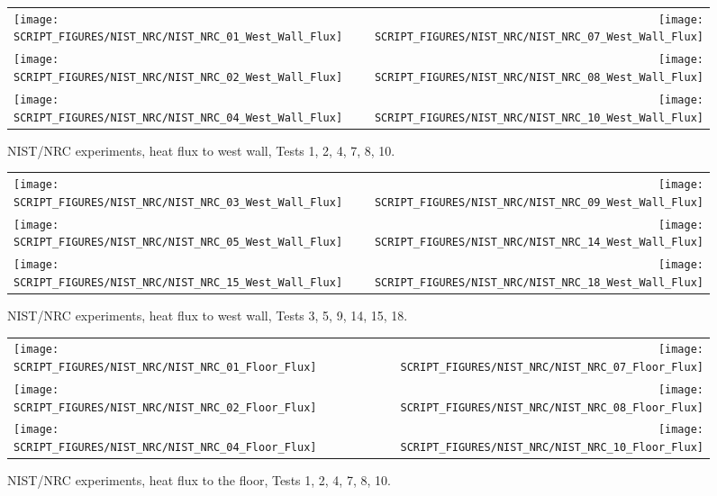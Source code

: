 \begin{figure}[p]
\begin{tabular*}{\textwidth}{l@{\extracolsep{\fill}}r}
\texttt{[image: SCRIPT\_FIGURES/NIST\_NRC/NIST\_NRC\_01\_West\_Wall\_Flux]} &
\texttt{[image: SCRIPT\_FIGURES/NIST\_NRC/NIST\_NRC\_07\_West\_Wall\_Flux]} \\
\texttt{[image: SCRIPT\_FIGURES/NIST\_NRC/NIST\_NRC\_02\_West\_Wall\_Flux]} &
\texttt{[image: SCRIPT\_FIGURES/NIST\_NRC/NIST\_NRC\_08\_West\_Wall\_Flux]} \\
\texttt{[image: SCRIPT\_FIGURES/NIST\_NRC/NIST\_NRC\_04\_West\_Wall\_Flux]} &
\texttt{[image: SCRIPT\_FIGURES/NIST\_NRC/NIST\_NRC\_10\_West\_Wall\_Flux]}
\end{tabular*}
\caption[NIST/NRC experiments, heat flux to west wall, Tests 1, 2, 4, 7, 8, 10]{NIST/NRC experiments, heat flux to west wall, Tests 1, 2, 4, 7, 8, 10.}
\label{NIST_NRC_West_Wall_Flux_Closed}
\end{figure}

\begin{figure}[p]
\begin{tabular*}{\textwidth}{l@{\extracolsep{\fill}}r}
\texttt{[image: SCRIPT\_FIGURES/NIST\_NRC/NIST\_NRC\_03\_West\_Wall\_Flux]} &
\texttt{[image: SCRIPT\_FIGURES/NIST\_NRC/NIST\_NRC\_09\_West\_Wall\_Flux]} \\
\texttt{[image: SCRIPT\_FIGURES/NIST\_NRC/NIST\_NRC\_05\_West\_Wall\_Flux]} &
\texttt{[image: SCRIPT\_FIGURES/NIST\_NRC/NIST\_NRC\_14\_West\_Wall\_Flux]} \\
\texttt{[image: SCRIPT\_FIGURES/NIST\_NRC/NIST\_NRC\_15\_West\_Wall\_Flux]} &
\texttt{[image: SCRIPT\_FIGURES/NIST\_NRC/NIST\_NRC\_18\_West\_Wall\_Flux]}
\end{tabular*}
\caption[NIST/NRC experiments, heat flux to west wall, Tests 3, 5, 9, 14, 15, 18]{NIST/NRC experiments, heat flux to west wall, Tests 3, 5, 9, 14, 15, 18.}
\label{NIST_NRC_West_Wall_Flux_Open}
\end{figure}

\begin{figure}[p]
\begin{tabular*}{\textwidth}{l@{\extracolsep{\fill}}r}
\texttt{[image: SCRIPT\_FIGURES/NIST\_NRC/NIST\_NRC\_01\_Floor\_Flux]} &
\texttt{[image: SCRIPT\_FIGURES/NIST\_NRC/NIST\_NRC\_07\_Floor\_Flux]} \\
\texttt{[image: SCRIPT\_FIGURES/NIST\_NRC/NIST\_NRC\_02\_Floor\_Flux]} &
\texttt{[image: SCRIPT\_FIGURES/NIST\_NRC/NIST\_NRC\_08\_Floor\_Flux]} \\
\texttt{[image: SCRIPT\_FIGURES/NIST\_NRC/NIST\_NRC\_04\_Floor\_Flux]} &
\texttt{[image: SCRIPT\_FIGURES/NIST\_NRC/NIST\_NRC\_10\_Floor\_Flux]}
\end{tabular*}
\caption[NIST/NRC experiments, heat flux to the floor, Tests 1, 2, 4, 7, 8, 10]{NIST/NRC experiments, heat flux to the floor, Tests 1, 2, 4, 7, 8, 10.}
\label{NIST_NRC_Floor_Flux_Closed}
\end{figure}

